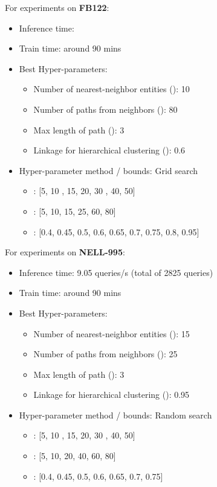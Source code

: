 \documentclass[11pt,a4paper]{article}
\newcommand{\fb}{FB122\xspace}
\newcommand{\nell}{NELL-995\xspace}
\begin{document}
For experiments on \textbf{\fb}:
\begin{itemize}
    \item Inference time: 
    \item Train time: around 90 mins
    \item Best Hyper-parameters: 
    \begin{itemize}
        \item Number of nearest-neighbor entities (): 10
        \item Number of paths from neighbors (): 80
        \item Max length of path (): 3
        \item Linkage for hierarchical clustering (): 0.6
    \end{itemize}
    \item Hyper-parameter method / bounds: Grid search
    \begin{itemize}
        \item : [5, 10 , 15, 20, 30 , 40, 50]
        \item : [5, 10, 15, 25, 60, 80]
        \item : [0.4, 0.45, 0.5, 0.6, 0.65, 0.7, 0.75, 0.8, 0.95]
    \end{itemize}
\end{itemize}

For experiments on \textbf{\nell}:
\begin{itemize}
    \item Inference time: 9.05 queries/s (total of 2825 queries)
    \item Train time: around 90 mins
    \item Best Hyper-parameters: 
    \begin{itemize}
        \item Number of nearest-neighbor entities (): 15
        \item Number of paths from neighbors (): 25
        \item Max length of path (): 3
        \item Linkage for hierarchical clustering (): 0.95
    \end{itemize}
    \item Hyper-parameter method / bounds: Random search
    \begin{itemize}
        \item : [5, 10 , 15, 20, 30 , 40, 50]
        \item : [5, 10, 20, 40, 60, 80]
        \item : [0.4, 0.45, 0.5, 0.6, 0.65, 0.7, 0.75]
    \end{itemize}
\end{itemize}

 
\end{document}

